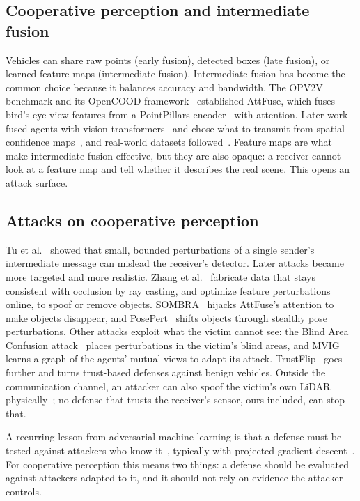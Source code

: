 \documentclass[conference]{IEEEtran}
\begin{document}
\subsection{Cooperative perception and intermediate fusion}
Vehicles can share raw points (early fusion), detected boxes (late fusion), or learned feature maps
(intermediate fusion). Intermediate fusion has become the common choice because it balances accuracy and
bandwidth. The OPV2V benchmark and its OpenCOOD framework~\cite{xu2022opv2v} established AttFuse, which fuses
bird's-eye-view features from a PointPillars encoder~\cite{lang2019pointpillars} with attention. Later work
fused agents with vision transformers~\cite{xu2022v2xvit} and chose what to transmit from spatial confidence
maps~\cite{hu2022where2comm}, and real-world datasets followed~\cite{xu2023v2v4real,luo2025mixedsignals}.
Feature maps are what make intermediate fusion effective, but they are also opaque: a receiver cannot look at a
feature map and tell whether it describes the real scene. This opens an attack surface.

\subsection{Attacks on cooperative perception}
Tu et al.~\cite{tu2021adversarial} showed that small, bounded perturbations of a single sender's intermediate
message can mislead the receiver's detector. Later attacks became more targeted and more realistic. Zhang et
al.~\cite{zhang2024cad} fabricate data that stays consistent with occlusion by ray casting, and optimize feature
perturbations online, to spoof or remove objects. SOMBRA~\cite{wang2025lucia} hijacks AttFuse's attention to make
objects disappear, and PosePert~\cite{zhang2026poseguard} shifts objects through stealthy pose perturbations. Other
attacks exploit what the victim cannot see: the Blind Area Confusion attack~\cite{tao2026gcp} places
perturbations in the victim's blind areas, and MVIG~\cite{tao2026mvig} learns a graph of the agents' mutual
views to adapt its attack. TrustFlip~\cite{liu2026trustflip} goes further and turns trust-based defenses against benign
vehicles. Outside the communication channel, an attacker can also spoof the victim's own LiDAR
physically~\cite{cao2019advlidar}; no defense that trusts the receiver's sensor, ours included, can stop that.

A recurring lesson from adversarial machine learning is that a defense must be tested against attackers who know
it~\cite{carlini2019evaluating,tramer2020adaptive}, typically with projected gradient descent~\cite{madry2018pgd}.
For cooperative perception this means two things: a defense should be evaluated against attackers adapted to it,
and it should not rely on evidence the attacker controls.
\end{document}
